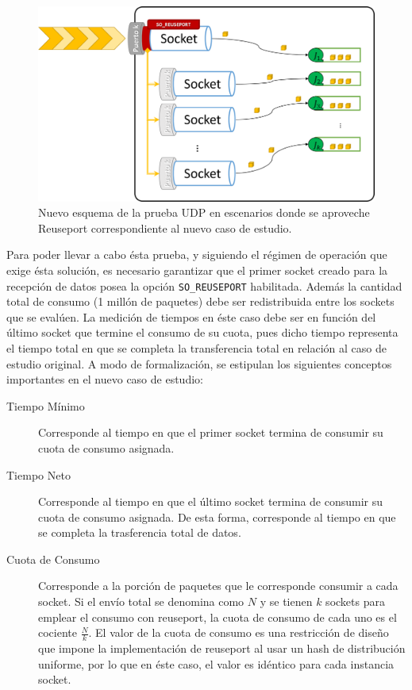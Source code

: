 \begin{figure}[!h]
	\centering
	\includegraphics[scale=.5]{imagenes/nuevocaso.png}
	\caption{Nuevo esquema de la prueba UDP en escenarios donde se aproveche Reuseport correspondiente al nuevo caso de estudio.}
	\label{fig:casoPruebaReuseport}
\end{figure}

Para poder llevar a cabo ésta prueba, y siguiendo el régimen de operación que exige ésta solución, es necesario garantizar que el primer socket creado para la recepción de datos posea la opción \verb=SO_REUSEPORT= habilitada. Además la cantidad total de consumo (1 millón de paquetes) debe ser redistribuida entre los sockets que se evalúen. La medición de tiempos en éste caso debe ser en función del último socket que termine el consumo de su cuota, pues dicho tiempo representa el tiempo total en que se completa la transferencia total en relación al caso de estudio original. A modo de formalización, se estipulan los siguientes conceptos importantes en el nuevo caso de estudio:
\begin{description}
\item[Tiempo Mínimo] Corresponde al tiempo en que el primer socket termina de consumir su cuota de consumo asignada.
\item[Tiempo Neto] Corresponde al tiempo en que el último socket termina de consumir su cuota de consumo asignada. De esta forma, corresponde al tiempo en que se completa la trasferencia total de datos.
\item[Cuota de Consumo] Corresponde a la porción de paquetes que le corresponde consumir a cada socket. Si el envío total se denomina como $N$ y se tienen $k$ sockets para emplear el consumo con reuseport, la cuota de consumo de cada uno es el cociente $\frac{N}{k}$. El valor de la cuota de consumo es una restricción de diseño que impone la implementación de reuseport al usar un hash de distribución uniforme, por lo que en éste caso, el valor es idéntico para cada instancia socket.
\end{description}

